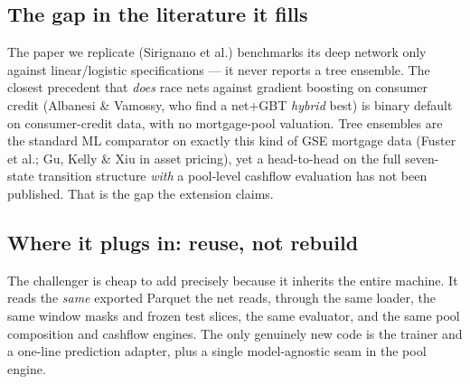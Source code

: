 \documentclass[11pt]{article}
\begin{document}
\subsection{The gap in the literature it fills}

\begin{intuition}
The paper we replicate (Sirignano et al.) benchmarks its deep network only against
linear/logistic specifications --- it never reports a tree ensemble. The closest precedent that
\emph{does} race nets against gradient boosting on consumer credit (Albanesi \& Vamossy, who
find a net$+$GBT \emph{hybrid} best) is binary default on consumer-credit data, with no
mortgage-pool valuation. Tree ensembles are the standard ML comparator on exactly this kind of
GSE mortgage data (Fuster et al.; Gu, Kelly \& Xiu in asset pricing), yet a head-to-head on the
full seven-state transition structure \emph{with} a pool-level cashflow evaluation has not been
published. That is the gap the extension claims.
\end{intuition}

\subsection{Where it plugs in: reuse, not rebuild}

The challenger is cheap to add precisely because it inherits the entire machine. It reads the
\emph{same} exported Parquet the net reads, through the same loader, the same window masks and
frozen test slices, the same evaluator, and the same pool composition and cashflow engines. The
only genuinely new code is the trainer and a one-line prediction adapter, plus a single
model-agnostic seam in the pool engine.
\end{document}
